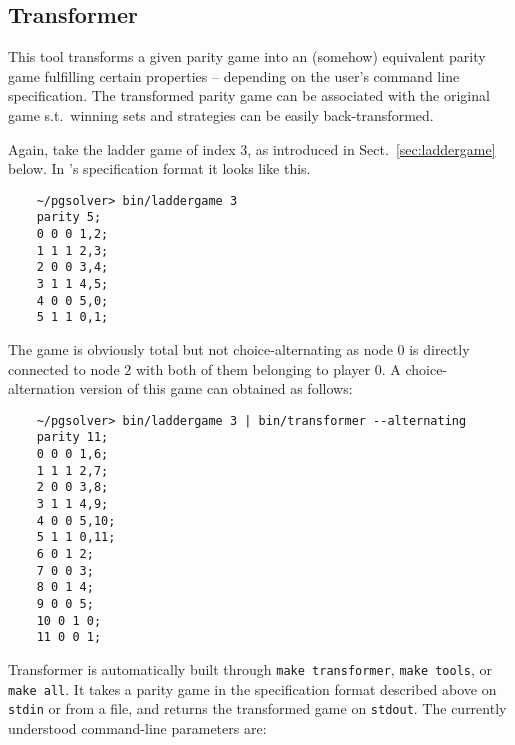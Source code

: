 \subsection{Transformer}

This tool transforms a given parity game into an (somehow) equivalent parity game fulfilling
certain properties -- depending on the user's command line specification. The transformed
parity game can be associated with the original game s.t.\ winning sets and strategies can
be easily back-transformed.


\begin{example}
Again, take the ladder game of index 3, as introduced in Sect.~\ref{sec:laddergame} below.
In \pgsolver's specification format it looks like this.
\begin{verbatim}
    ~/pgsolver> bin/laddergame 3
    parity 5;
    0 0 0 1,2;
    1 1 1 2,3;
    2 0 0 3,4;
    3 1 1 4,5;
    4 0 0 5,0;
    5 1 1 0,1;
\end{verbatim}
The game is obviously total but not choice-alternating as node $0$ is directly connected to node $2$
with both of them belonging to player $0$. A choice-alternation version of this game can obtained as follows:
\begin{verbatim}
    ~/pgsolver> bin/laddergame 3 | bin/transformer --alternating
    parity 11;
    0 0 0 1,6;
    1 1 1 2,7;
    2 0 0 3,8;
    3 1 1 4,9;
    4 0 0 5,10;
    5 1 1 0,11;
    6 0 1 2;
    7 0 0 3;
    8 0 1 4;
    9 0 0 5;
    10 0 1 0;
    11 0 0 1;
\end{verbatim}
\end{example}

Transformer is automatically built through \verb#make transformer#,
\verb#make tools#, or \verb#make all#.
It takes a parity game in the specification format described above on \texttt{stdin} or from a file,
and returns the transformed game on \texttt{stdout}. The currently understood command-line parameters are:

